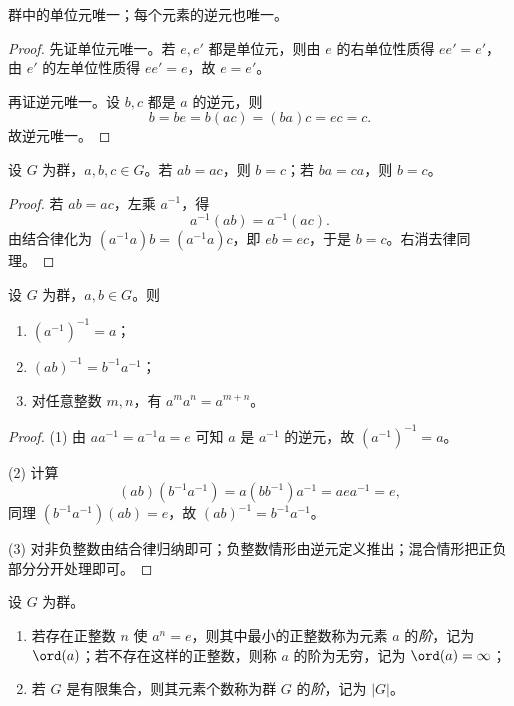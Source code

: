 \begin{lemma}
群中的单位元唯一；每个元素的逆元也唯一。
\end{lemma}

\begin{proof}
先证单位元唯一。若 $e,e'$ 都是单位元，则由 $e$ 的右单位性质得 $ee'=e'$，由 $e'$ 的左单位性质得 $ee'=e$，故 $e=e'$。

再证逆元唯一。设 $b,c$ 都是 $a$ 的逆元，则
\[
 b=be=b(ac)=(ba)c=ec=c.
\]
故逆元唯一。
\end{proof}

\begin{proposition}[消去律]
设 $G$ 为群，$a,b,c \in G$。若 $ab=ac$，则 $b=c$；若 $ba=ca$，则 $b=c$。
\end{proposition}

\begin{proof}
若 $ab=ac$，左乘 $a^{-1}$，得
\[
 a^{-1}(ab)=a^{-1}(ac).
\]
由结合律化为 $(a^{-1}a)b=(a^{-1}a)c$，即 $eb=ec$，于是 $b=c$。右消去律同理。
\end{proof}

\begin{proposition}
设 $G$ 为群，$a,b \in G$。则
\begin{enumerate}[label=\textnormal{(\arabic*)}, leftmargin=3em]
  \item $(a^{-1})^{-1}=a$；
  \item $(ab)^{-1}=b^{-1}a^{-1}$；
  \item 对任意整数 $m,n$，有 $a^m a^n=a^{m+n}$。
\end{enumerate}
\end{proposition}

\begin{proof}
(1) 由 $aa^{-1}=a^{-1}a=e$ 可知 $a$ 是 $a^{-1}$ 的逆元，故 $(a^{-1})^{-1}=a$。

(2) 计算
\[
(ab)(b^{-1}a^{-1})=a(bb^{-1})a^{-1}=aea^{-1}=e,
\]
同理 $(b^{-1}a^{-1})(ab)=e$，故 $(ab)^{-1}=b^{-1}a^{-1}$。

(3) 对非负整数由结合律归纳即可；负整数情形由逆元定义推出；混合情形把正负部分分开处理即可。
\end{proof}

\begin{definition}
设 $G$ 为群。
\begin{enumerate}[label=\textnormal{(\arabic*)}, leftmargin=3em]
  \item 若存在正整数 $n$ 使 $a^n=e$，则其中最小的正整数称为元素 $a$ 的\emph{阶}，记为 $\ord(a)$；若不存在这样的正整数，则称 $a$ 的阶为无穷，记为 $\ord(a)=\infty$；
  \item 若 $G$ 是有限集合，则其元素个数称为群 $G$ 的\emph{阶}，记为 $|G|$。
\end{enumerate}
\end{definition}

